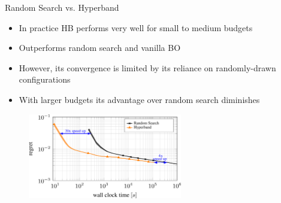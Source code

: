 
\begin{frame}{Random Search vs. Hyperband}
\begin{itemize}
    \item In practice HB performs very well for small to medium budgets
    \item Outperforms random search and vanilla BO
    \item However, its convergence is limited by its reliance on randomly-drawn configurations
    \item With larger budgets its advantage over random search diminishes
\end{itemize}
\begin{figure}
    \centering
    \includegraphics[width=0.6\textwidth]{images/hyperband/comparison_rs_hb.png}
\end{figure}


\end{frame}

